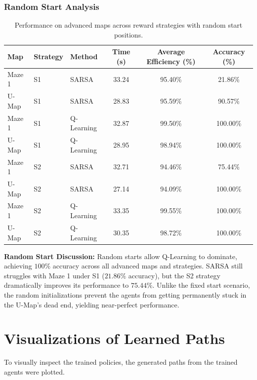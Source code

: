 \documentclass{article}
\begin{document}
\subsubsection{Random Start Analysis}
\begin{table}[H]
\centering
\begin{tabular}{lllccc}
\toprule
\textbf{Map} & \textbf{Strategy} & \textbf{Method} & \textbf{Time (s)} & \textbf{Average Efficiency (\%)} & \textbf{Accuracy (\%)} \\ \midrule
Maze 1 & S1 & SARSA       & 33.24 & 95.40\% & 21.86\% \\
U-Map  & S1 & SARSA       & 28.83 & 95.59\% & 90.57\% \\
Maze 1 & S1 & Q-Learning  & 32.87 & 99.50\% & 100.00\% \\
U-Map  & S1 & Q-Learning  & 28.95 & 98.94\% & 100.00\% \\
Maze 1 & S2 & SARSA       & 32.71 & 94.46\% & 75.44\% \\
U-Map  & S2 & SARSA       & 27.14 & 94.09\% & 100.00\% \\
Maze 1 & S2 & Q-Learning  & 33.35 & 99.55\% & 100.00\% \\
U-Map  & S2 & Q-Learning  & 30.35 & 98.72\% & 100.00\% \\ \bottomrule
\end{tabular}
\caption{Performance on advanced maps across reward strategies with random start positions.}
\end{table}

\textbf{Random Start Discussion:} Random starts allow Q-Learning to dominate, achieving $100\%$ accuracy across all advanced maps and strategies. SARSA still struggles with Maze 1 under S1 ($21.86\%$ accuracy), but the S2 strategy dramatically improves its performance to $75.44\%$. Unlike the fixed start scenario, the random initializations prevent the agents from getting permanently stuck in the U-Map's dead end, yielding near-perfect performance.


\section{Visualizations of Learned Paths}
To visually inspect the trained policies, the generated paths from the trained agents were plotted.
\end{document}
